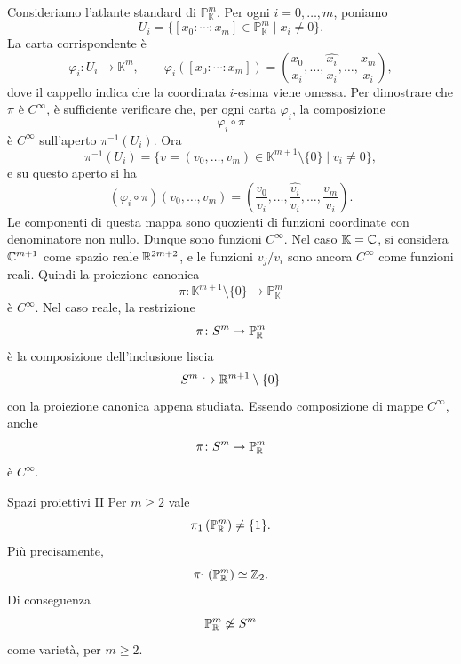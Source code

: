 \documentclass[a4paper]{article}
\begin{document}
\begin{snippetproof}{}
    Consideriamo l'atlante standard di \(\mathbb{P}^m_{\mathbb{K}}\). Per ogni \(i=0,\dots,m\), poniamo
    \[
        U_i=\{[x_0:\cdots:x_m]\in\mathbb{P}^m_{\mathbb{K}}\mid x_i\neq0\}.
    \]
    La carta corrispondente è
    \[
        \varphi_i\colon U_i\to\mathbb{K}^m,
        \qquad
        \varphi_i([x_0:\cdots:x_m])
        =
        \left(
            \frac{x_0}{x_i},\dots,\widehat{\frac{x_i}{x_i}},\dots,\frac{x_m}{x_i}
        \right),
    \]
    dove il cappello indica che la coordinata \(i\)-esima viene omessa.
    Per dimostrare che \(\pi\) è \(C^\infty\), è sufficiente verificare che, per ogni carta \(\varphi_i\), la composizione
    \[
        \varphi_i\circ\pi
    \]
    è \(C^\infty\) sull'aperto \(\pi^{-1}(U_i)\). Ora
    \[
        \pi^{-1}(U_i)=\{v=(v_0,\dots,v_m)\in\mathbb{K}^{m+1}\setminus\{0\}\mid v_i\neq0\},
    \]
    e su questo aperto si ha
    \[
        (\varphi_i\circ\pi)(v_0,\dots,v_m)
        =
        \left(
            \frac{v_0}{v_i},\dots,\widehat{\frac{v_i}{v_i}},\dots,\frac{v_m}{v_i}
        \right).
    \]
    Le componenti di questa mappa sono quozienti di funzioni coordinate con denominatore non nullo. Dunque sono funzioni \(C^\infty\). Nel caso \(\mathbb{K}=\mathbb{C}\), si considera \(\mathbb{C}^{m+1}\) come spazio reale \(\mathbb{R}^{2m+2}\), e le funzioni \(v_j/v_i\) sono ancora \(C^\infty\) come funzioni reali. Quindi la proiezione canonica
    \[
        \pi\colon \mathbb{K}^{m+1}\setminus\{0\}\to\mathbb{P}^m_{\mathbb{K}}
    \]
    è \(C^\infty\).
    Nel caso reale, la restrizione
    \[
        \pi\colon S^m\to\mathbb{P}^m_{\mathbb{R}}
    \]
    è la composizione dell'inclusione liscia
    \[
        S^m\hookrightarrow \mathbb{R}^{m+1}\setminus\{0\}
    \]
    con la proiezione canonica appena studiata. Essendo composizione di mappe \(C^\infty\), anche
    \[
        \pi\colon S^m\to\mathbb{P}^m_{\mathbb{R}}
    \]
    è \(C^\infty\).
\end{snippetproof}

\begin{snippetproposition}{Spazi proiettivi II}
    Per \(m\geq 2\) vale
    \[
        \pi_1\left(\mathbb{P}^m_{\mathbb{R}}\right)\neq \{1\}.
    \]
    Più precisamente,
    \[
        \pi_1\left(\mathbb{P}^m_{\mathbb{R}}\right)\simeq \mathbb{Z}_2.
    \]
    Di conseguenza
    \[
        \mathbb{P}^m_{\mathbb{R}}\not\simeq S^m
    \]
    come varietà, per \(m\geq 2\).
\end{snippetproposition}
\end{document}
